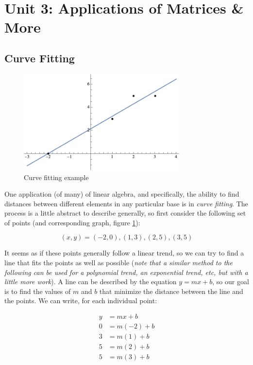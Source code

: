\documentclass[12pt]{article}
\begin{document}
\section[Unit 3]{Unit 3: Applications of Matrices \& More}

\subsection{Curve Fitting}

\begin{figure}[!ht]
    \centering
    \includegraphics[width=8.5cm]{misc/linearregressionexample.png}
    \caption{Curve fitting example}
    \label{fig:curvefitting}
\end{figure}

One application (of many) of linear algebra, and specifically, the ability to find distances between different elements in any particular base is in \textit{curve fitting}. The process is a little abstract to describe generally, so first consider the following set of points (and corresponding graph, figure \ref{fig:curvefitting}):

$$(x,y) = (-2,0), (1,3), (2,5), (3,5)$$

It seems as if these points generally follow a linear trend, so we can try to find a line that fits the points as well as possible (\textit{note that a similar method to the following can be used for a polynomial trend, an exponential trend, etc, but with a little more work}). A line can be described by the equation $y = mx+b$, so our goal is to find the values of $m$ and $b$ that minimize the distance between the line and the points. We can write, for each individual point:

\begin{equation}
    \begin{split}
        y &= mx+b\\
        0 &= m(-2)+b\\
        3 &= m(1)+b\\
        5 &= m(2)+b\\
        5 &= m(3)+b
    \end{split}
\end{equation}
\end{document}
